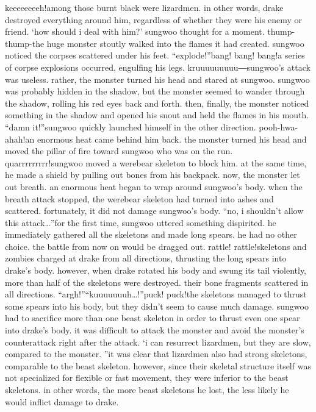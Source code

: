 keeeeeeeeh!among those burnt black were lizardmen.
 in other words, drake destroyed everything around him, regardless of whether they were his enemy or friend.
‘how should i deal with him?’ sungwoo thought for a moment.
thump- thump-the huge monster stoutly walked into the flames it had created.
 sungwoo noticed the corpses scattered under his feet.
“explode!”bang! bang! bang!a series of corpse explosions occurred, engulfing his legs.
kruuuuuuuuu―sungwoo’s attack was useless.
rather, the monster turned his head and stared at sungwoo.
 sungwoo was probably hidden in the shadow, but the monster seemed to wander through the shadow, rolling his red eyes back and forth.
then, finally, the monster noticed something in the shadow and opened his snout and held the flames in his mouth.
“damn it!”sungwoo quickly launched himself in the other direction.
pooh-hwa-ahah!an enormous heat came behind him back.
 the monster turned his head and moved the pillar of fire toward sungwoo who was on the run.
quarrrrrrrrr!sungwoo moved a werebear skeleton to block him.
 at the same time, he made a shield by pulling out bones from his backpack.
 now, the monster let out breath.
 an enormous heat began to wrap around sungwoo’s body.
when the breath attack stopped, the werebear skeleton had turned into ashes and scattered.
 fortunately, it did not damage sungwoo’s body.
“no, i shouldn’t allow this attack…”for the first time, sungwoo uttered something dispirited.
 he immediately gathered all the skeletons and made long spears.
 he had no other choice.
 the battle from now on would be dragged out.
rattle! rattle!skeletons and zombies charged at drake from all directions, thrusting the long spears into drake’s body.
however, when drake rotated his body and swung its tail violently, more than half of the skeletons were destroyed.
 their bone fragments scattered in all directions.
“argh!”“kuuuuuuuh…!”puck! puck!the skeletons managed to thrust some spears into his body, but they didn’t seem to cause much damage.
sungwoo had to sacrifice more than one beast skeleton in order to thrust even one spear into drake’s body.
 it was difficult to attack the monster and avoid the monster’s counterattack right after the attack.
‘i can resurrect lizardmen, but they are slow, compared to the monster.
”it was clear that lizardmen also had strong skeletons, comparable to the beast skeleton.
however, since their skeletal structure itself was not specialized for flexible or fast movement, they were inferior to the beast skeletons.
 in other words, the more beast skeletons he lost, the less likely he would inflict damage to drake.
